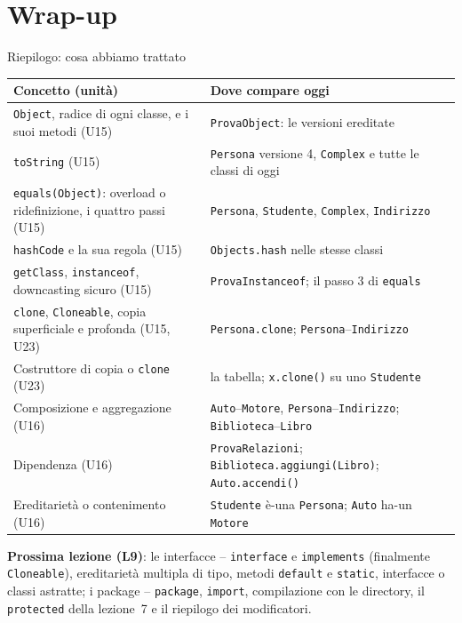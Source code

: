 \documentclass[10pt,aspectratio=169]{beamer}
\begin{document}
\section{Wrap-up}

\begin{frame}{Riepilogo: cosa abbiamo trattato}
\footnotesize
\begin{center}
\renewcommand{\arraystretch}{1.25}
\scriptsize
\begin{tabular}{|l|l|}
\hline
\textbf{Concetto (unità)} & \textbf{Dove compare oggi} \\
\hline
\texttt{Object}, radice di ogni classe, e i suoi metodi (U15) & \texttt{ProvaObject}: le versioni ereditate \\
\hline
\texttt{toString} (U15) & \texttt{Persona} versione 4, \texttt{Complex} e tutte le classi di oggi \\
\hline
\texttt{equals(Object)}: overload o ridefinizione, i quattro passi (U15) & \texttt{Persona}, \texttt{Studente}, \texttt{Complex}, \texttt{Indirizzo} \\
\hline
\texttt{hashCode} e la sua regola (U15) & \texttt{Objects.hash} nelle stesse classi \\
\hline
\texttt{getClass}, \texttt{instanceof}, downcasting sicuro (U15) & \texttt{ProvaInstanceof}; il passo 3 di \texttt{equals} \\
\hline
\texttt{clone}, \texttt{Cloneable}, copia superficiale e profonda (U15, U23) & \texttt{Persona.clone}; \texttt{Persona}--\texttt{Indirizzo} \\
\hline
Costruttore di copia o \texttt{clone} (U23) & la tabella; \texttt{x.clone()} su uno \texttt{Studente} \\
\hline
Composizione e aggregazione (U16) & \texttt{Auto}--\texttt{Motore}, \texttt{Persona}--\texttt{Indirizzo}; \texttt{Biblioteca}--\texttt{Libro} \\
\hline
Dipendenza (U16) & \texttt{ProvaRelazioni}; \texttt{Biblioteca.aggiungi(Libro)}; \texttt{Auto.accendi()} \\
\hline
Ereditarietà o contenimento (U16) & \texttt{Studente} è-una \texttt{Persona}; \texttt{Auto} ha-un \texttt{Motore} \\
\hline
\end{tabular}
\end{center}

\vspace{0.1cm}
\textbf{Prossima lezione (L9)}: le interfacce -- \texttt{interface} e \texttt{implements} (finalmente \texttt{Cloneable}), ereditarietà multipla di tipo, metodi \texttt{default} e \texttt{static}, interfacce o classi astratte; i package -- \texttt{package}, \texttt{import}, compilazione con le directory, il \texttt{protected} della lezione~7 e il riepilogo dei modificatori.
\end{frame}
\end{document}
